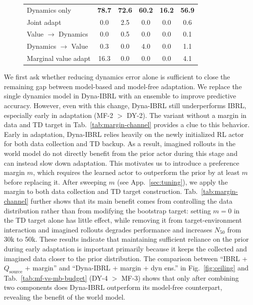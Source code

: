 \documentclass{article} %
\begin{document}
\begin{figure}[t]
\begin{minipage}[t]{0.525\textwidth}
{\begin{tabular}{@{}lccccc@{}}
\midrule
Dynamics only
  & \textbf{78.7} & \textbf{72.6} & \textbf{60.2} & \textbf{16.2} & \textbf{56.9} \\
Joint adapt
  & 0.0 & 2.5 & 0.0 & 0.0 & 0.6 \\
Value $\to$ Dynamics
  & 0.0 & 0.5 & 0.0 & 0.0 & 0.1 \\
Dynamics $\to$ Value
  & 0.3 & 0.0 & 4.0 & 0.0 & 1.1 \\
Marginal value adapt
  & 16.3 & 0.0 & 0.0 & 0.0 & 4.1 \\
\bottomrule
\end{tabular}}
\label{tab:value-adapt}
\end{minipage}
\end{figure}

We first ask whether reducing dynamics error alone is sufficient to close the remaining gap between model-based and model-free adaptation. We replace the single dynamics model in Dyna-IBRL with an ensemble to improve predictive accuracy. However, even with this change, Dyna-IBRL still underperforms IBRL, especially early in adaptation (MF-2 $>$ DY-2). The variant without a margin in data and TD target in Tab.~\ref{tab:margin-channel} provides a clue to this behavior. Early in adaptation, Dyna-IBRL relies heavily on the newly initialized RL actor for both data collection and TD backup. As a result, imagined rollouts in the world model do not directly benefit from the prior actor during this stage and can instead slow down adaptation. This motivates us to introduce a preference margin $m$, which requires the learned actor to outperform the prior by at least $m$ before replacing it. After sweeping $m$ (see App.~\ref{sec:tuning}), we apply the margin to both data collection and TD target construction. Tab.~\ref{tab:margin-channel} further shows that its main benefit comes from controlling the data distribution rather than from modifying the bootstrap target: setting $m=0$ in the TD target alone has little effect, while removing it from target-environment interaction and imagined rollouts degrades performance and increases $N_{50}$ from 30k to 50k. These results indicate that maintaining sufficient reliance on the prior during early adaptation is important primarily because it keeps the collected and imagined data closer to the prior distribution. The comparison between ``IBRL + $Q_{\text{source}}$ + margin'' and ``Dyna-IBRL + margin + dyn ens.'' in Fig.~\ref{fig:ceiling} and Tab.~\ref{tab:mf-vs-mb-budget} (DY-4 $>$ MF-3) shows that only after combining two components does Dyna-IBRL outperform its model-free counterpart, revealing the benefit of the world model.
\end{document}

